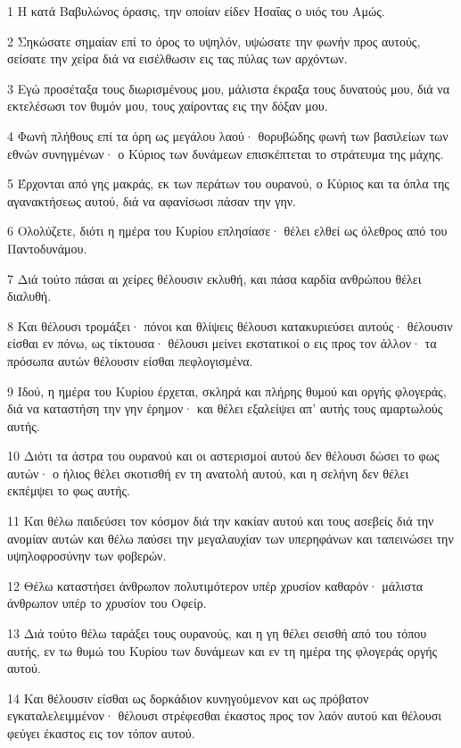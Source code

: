 \par 1 Η κατά Βαβυλώνος όρασις, την οποίαν είδεν Ησαΐας ο υιός του Αμώς.
\par 2 Σηκώσατε σημαίαν επί το όρος το υψηλόν, υψώσατε την φωνήν προς αυτούς, σείσατε την χείρα διά να εισέλθωσιν εις τας πύλας των αρχόντων.
\par 3 Εγώ προσέταξα τους διωρισμένους μου, μάλιστα έκραξα τους δυνατούς μου, διά να εκτελέσωσι τον θυμόν μου, τους χαίροντας εις την δόξαν μου.
\par 4 Φωνή πλήθους επί τα όρη ως μεγάλου λαού· θορυβώδης φωνή των βασιλείων των εθνών συνηγμένων· ο Κύριος των δυνάμεων επισκέπτεται το στράτευμα της μάχης.
\par 5 Έρχονται από γης μακράς, εκ των περάτων του ουρανού, ο Κύριος και τα όπλα της αγανακτήσεως αυτού, διά να αφανίσωσι πάσαν την γην.
\par 6 Ολολύζετε, διότι η ημέρα του Κυρίου επλησίασε· θέλει ελθεί ως όλεθρος από του Παντοδυνάμου.
\par 7 Διά τούτο πάσαι αι χείρες θέλουσιν εκλυθή, και πάσα καρδία ανθρώπου θέλει διαλυθή.
\par 8 Και θέλουσι τρομάξει· πόνοι και θλίψεις θέλουσι κατακυριεύσει αυτούς· θέλουσιν είσθαι εν πόνω, ως τίκτουσα· θέλουσι μείνει εκστατικοί ο εις προς τον άλλον· τα πρόσωπα αυτών θέλουσιν είσθαι πεφλογισμένα.
\par 9 Ιδού, η ημέρα του Κυρίου έρχεται, σκληρά και πλήρης θυμού και οργής φλογεράς, διά να καταστήση την γην έρημον· και θέλει εξαλείψει απ' αυτής τους αμαρτωλούς αυτής.
\par 10 Διότι τα άστρα του ουρανού και οι αστερισμοί αυτού δεν θέλουσι δώσει το φως αυτών· ο ήλιος θέλει σκοτισθή εν τη ανατολή αυτού, και η σελήνη δεν θέλει εκπέμψει το φως αυτής.
\par 11 Και θέλω παιδεύσει τον κόσμον διά την κακίαν αυτού και τους ασεβείς διά την ανομίαν αυτών και θέλω παύσει την μεγαλαυχίαν των υπερηφάνων και ταπεινώσει την υψηλοφροσύνην των φοβερών.
\par 12 Θέλω καταστήσει άνθρωπον πολυτιμότερον υπέρ χρυσίον καθαρόν· μάλιστα άνθρωπον υπέρ το χρυσίον του Οφείρ.
\par 13 Διά τούτο θέλω ταράξει τους ουρανούς, και η γη θέλει σεισθή από του τόπου αυτής, εν τω θυμώ του Κυρίου των δυνάμεων και εν τη ημέρα της φλογεράς οργής αυτού.
\par 14 Και θέλουσιν είσθαι ως δορκάδιον κυνηγούμενον και ως πρόβατον εγκαταλελειμμένον· θέλουσι στρέφεσθαι έκαστος προς τον λαόν αυτού και θέλουσι φεύγει έκαστος εις τον τόπον αυτού.
